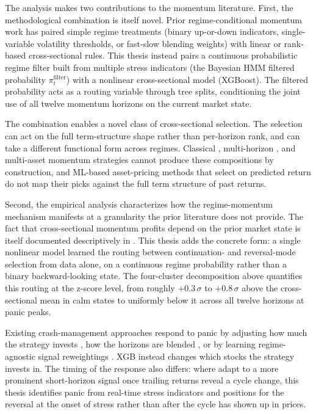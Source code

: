 The analysis makes two contributions to the momentum literature. First, the methodological combination is itself novel. Prior regime-conditional momentum work has paired simple regime treatments (binary up-or-down indicators, single-variable volatility thresholds, or fast-slow blending weights) with linear or rank-based cross-sectional rules. This thesis instead pairs a continuous probabilistic regime filter built from multiple stress indicators (the Bayesian HMM filtered probability $\pi_t^{\text{filter}}$) with a nonlinear cross-sectional model (XGBoost). The filtered probability acts as a routing variable through tree splits, conditioning the joint use of all twelve momentum horizons on the current market state.

The combination enables a novel class of cross-sectional selection. The selection can act on the full term-structure shape rather than per-horizon rank, and can take a different functional form across regimes. Classical \citep{JegadeeshTitman1993}, multi-horizon \citep{NovyMarx2012}, and multi-asset \citep{Asness2013} momentum strategies cannot produce these compositions by construction, and ML-based asset-pricing methods that select on predicted return \citep{Gu2020, BeckmeyerWiedemann2025} do not map their picks against the full term structure of past returns.

Second, the empirical analysis characterizes how the regime-momentum mechanism manifests at a granularity the prior literature does not provide. The fact that cross-sectional momentum profits depend on the prior market state is itself documented descriptively in \citet{Cooper2004}. This thesis adds the concrete form: a single nonlinear model learned the routing between continuation- and reversal-mode selection from data alone, on a continuous regime probability rather than a binary backward-looking state. The four-cluster decomposition above quantifies this routing at the z-score level, from roughly $+0.3\,\sigma$ to $+0.8\,\sigma$ above the cross-sectional mean in calm states to uniformly below it across all twelve horizons at panic peaks.

Existing crash-management approaches respond to panic by adjusting how much the strategy invests \citep{DanielMoskowitz2016, BarrosoSantaClara2015}, how the horizons are blended \citep{GHM2023}, or by learning regime-agnostic signal reweightings \citep{BeckmeyerWiedemann2025}. XGB instead changes which stocks the strategy invests in. The timing of the response also differs: where \citeauthor{GHM2023} adapt to a more prominent short-horizon signal once trailing returns reveal a cycle change, this thesis identifies panic from real-time stress indicators and positions for the reversal at the onset of stress rather than after the cycle has shown up in prices.

